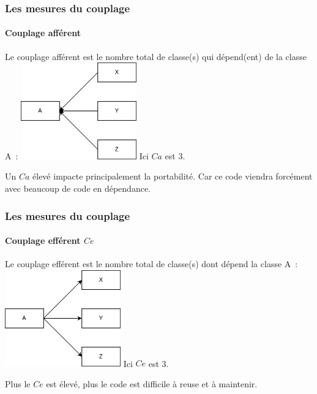 \documentclass{beamer}
\begin{document}
    \begin{frame}
        \transdissolve
        \frametitle{Les mesures du couplage}
        \framesubtitle{Couplage afférent}
        Le couplage afférent est le nombre total de classe(s) qui dépend(ent) de la classe A~:
        \bigbreak
        \centering
        \includegraphics[width=5cm]{image/afferent-coupling.drawio}
        \bigbreak
        \flushleft
        Ici $Ca$ est 3.

        Un $Ca$ élevé impacte principalement la portabilité.
        Car ce code viendra forcément avec beaucoup de code en dépendance.
    \end{frame}

    \begin{frame}
        \transdissolve
        \frametitle{Les mesures du couplage}
        \framesubtitle{Couplage efférent $Ce$}
        Le couplage efférent est le nombre total de classe(s) dont dépend la classe A~:
        \bigbreak
        \centering
        \includegraphics[width=5cm]{image/efferent-coupling.drawio}
        \bigbreak
        \flushleft
        Ici $Ce$ est 3.

        Plus le $Ce$ est élevé, plus le code est difficile à reuse et à maintenir.
    \end{frame}
\end{document}
